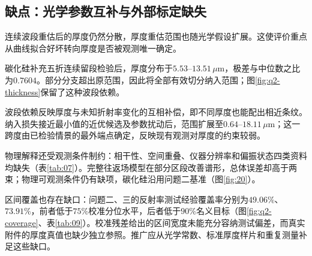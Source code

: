 \subsection{缺点：光学参数互补与外部标定缺失}
\label{sec:limitations}

连续波段重估后的厚度仍然分散，厚度重估范围也随光学假设扩展。这使评价重点从曲线拟合好坏转向厚度是否被观测唯一确定。

碳化硅补充五折连续留段检验后，厚度分布于$5.53$--$13.51\,\mu\mathrm{m}$，极差与中位数之比为$0.7604$。部分分支超出原范围，因此将全部有效切分纳入范围；图\ref{fig:q2-thickness}保留了这种波段依赖。

波段依赖反映厚度与未知折射率变化的互相补偿，即不同厚度也能配出相近条纹。纳入损失接近最小值的近优候选及参数扰动后，范围扩展至$0.64$--$18.11\,\mu\mathrm{m}$；这一跨度由已检验情景的最外端点确定，反映现有观测对厚度的约束较弱。

物理解释还受观测条件制约：相干性、空间重叠、仪器分辨率和偏振状态四类资料均缺失（表\ref{tab:07}）。完整往返场模型在部分区段改善谱形，总体误差却高于两束；物理可观测条件仍有缺项，碳化硅沿用问题二基准（图\ref{fig:20}）。

区间覆盖也存在缺口：问题二、三的反射率测试经验覆盖率分别为$49.06\%$、$73.91\%$，前者低于$75\%$校准分位水平，后者低于$90\%$名义目标（图\ref{fig:q2-coverage}、表\ref{tab:09}）。校准残差给出的区间宽度未能充分容纳测试偏差，而真实附件的厚度真值也缺少独立参照。推广应从光学常数、标准厚度样片和重复测量补足这些缺口。
